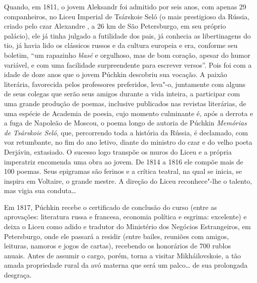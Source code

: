 Quando, em 1811, o jovem Aleksandr foi admitido por seis anos, com apenas
29 companheiros, no Liceu Imperial de Tsárskoie Seló (o mais
prestigioso da Rússia, criado pelo czar Alexandre , a 26 km de São
Petersburgo, em seu próprio palácio), ele já tinha julgado a futilidade
dos pais, já conhecia as libertinagens do tio, já havia lido os
clássicos russos e da cultura europeia e era, conforme seu boletim, ``um
rapazinho \emph{blasé} e orgulhoso, mas de bom coração, apesar do humor
variável, e com uma facilidade surpreendente para escrever versos''.
Pois foi com a idade de doze anos que o jovem Púchkin descobriu sua
vocação. A paixão literária, favorecida pelos professores preferidos,
leva"-o, juntamente com alguns de seus colegas que serão seus amigos
durante a vida inteira, a participar com uma grande produção de poemas,
inclusive publicados nas revistas literárias, de uma espécie de Academia
de poesia, cujo momento culminante é, após a derrota e a fuga de
Napoleão de Moscou, o poema longo de autoria de Púchkin \emph{Memórias de
Tsárskoie Seló}, que, percorrendo toda a história da Rússia, é declamado, com voz retumbante, no fim do ano letivo, diante do
ministro do czar e do velho poeta Derjávin, extasiado. O sucesso logo
transpõe os muros do Liceu e a própria imperatriz encomenda uma
obra ao jovem. De 1814 a 1816 ele compõe mais de 100 poemas. Seus epigramas são
ferinos e a crítica teatral, na qual se inicia, se inspira em Voltaire, o
grande mestre. A direção do Liceu reconhece"-lhe o talento, mas vigia sua
conduta\ldots{}

Em 1817, Púchkin recebe o certificado de conclusão do curso (entre as
aprovações: literatura russa e francesa, economia política e esgrima:
excelente) e deixa o Liceu como adido e tradutor do Ministério
dos Negócios Estrangeiros, em Petersburgo, onde ele passará a residir
(entre bailes, reuniões com amigos, leituras, namoros e jogos de
cartas), recebendo os honorários de 700 rublos anuais. Antes de assumir
o cargo, porém, torna a visitar Mikháilovskoie, a tão amada propriedade
rural da avó materna que será um palco\ldots{} de sua prolongada desgraça.

